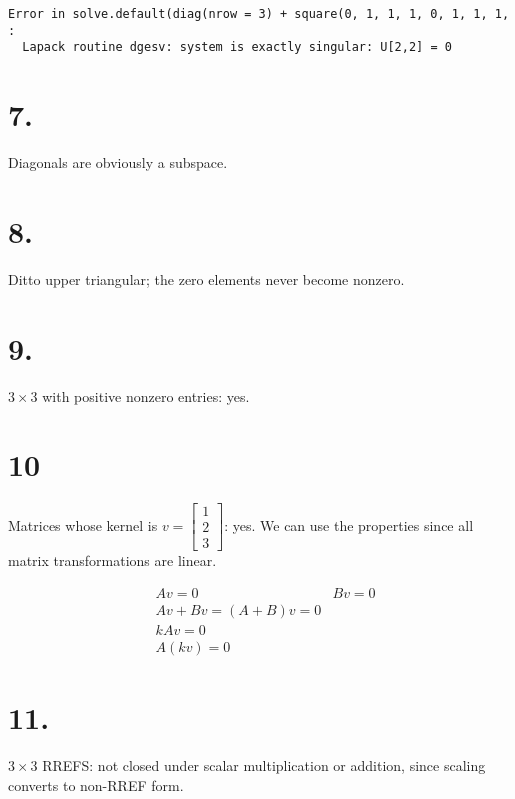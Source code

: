 \documentclass[]{article}
\begin{document}
\begin{verbatim}
Error in solve.default(diag(nrow = 3) + square(0, 1, 1, 1, 0, 1, 1, 1,  : 
  Lapack routine dgesv: system is exactly singular: U[2,2] = 0
\end{verbatim}

\hypertarget{section-6}{%
\section{7.}\label{section-6}}

Diagonals are obviously a subspace.

\hypertarget{section-7}{%
\section{8.}\label{section-7}}

Ditto upper triangular; the zero elements never become nonzero.

\hypertarget{section-8}{%
\section{9.}\label{section-8}}

\(3\times{3}\) with positive nonzero entries: yes.

\hypertarget{section-9}{%
\section{10}\label{section-9}}

Matrices whose kernel is \(v=\begin{bmatrix}1\\2\\3\end{bmatrix}\): yes.
We can use the properties since all matrix transformations are linear.

\[\begin{aligned}&Av=0&Bv=0\\
&Av+Bv = (A+B)v=0\\
&kAv=0\\
&A(kv)=0\end{aligned}\]

\hypertarget{section-10}{%
\section{11.}\label{section-10}}

\(3\times{3}\) RREFS: not closed under scalar multiplication or
addition, since scaling converts to non-RREF form.
\end{document}

